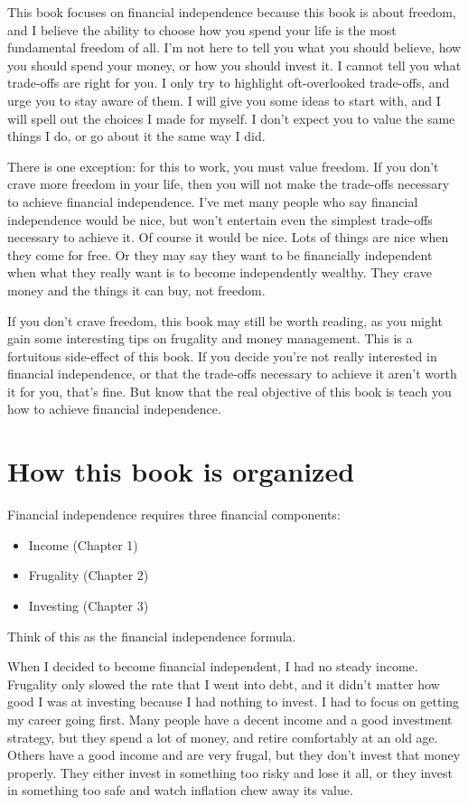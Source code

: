 This book focuses on financial independence because this book is about freedom, and I believe the ability to choose how you spend your life is the most fundamental freedom of all. I'm not here to tell you what you should believe, how you should spend your money, or how you should invest it. I cannot tell you what trade-offs are right for you. I only try to highlight oft-overlooked trade-offs, and urge you to stay aware of them. I will give you some ideas to start with, and I will spell out the choices I made for myself. I don't expect you to value the same things I do, or go about it the same way I did.

There is one exception: for this to work, you must value freedom. If you don't crave more freedom in your life, then you will not make the trade-offs necessary to achieve financial independence. I've met many people who say financial independence would be nice, but won't entertain even the simplest trade-offs necessary to achieve it. Of course it would be nice. Lots of things are nice when they come for free. Or they may say they want to be financially independent when what they really want is to become independently wealthy. They crave money and the things it can buy, not freedom.

If you don't crave freedom, this book may still be worth reading, as you might gain some interesting tips on frugality and money management. This is a fortuitous side-effect of this book. If you decide you're not really interested in financial independence, or that the trade-offs necessary to achieve it aren't worth it for you, that's fine. But know that the real objective of this book is teach you how to achieve financial independence.

\section{How this book is organized}
Financial independence requires three financial components:
\begin{itemize}
\item Income (Chapter 1)
\item Frugality (Chapter 2)
\item Investing (Chapter 3)
\end{itemize}

Think of this as the financial independence formula.

When I decided to become financial independent, I had no steady income. Frugality only slowed the rate that I went into debt, and it didn't matter how good I was at investing because I had nothing to invest. I had to focus on getting my career going first. Many people have a decent income and a good investment strategy, but they spend a lot of money, and retire comfortably at an old age. Others have a good income and are very frugal, but they don't invest that money properly. They either invest in something too risky and lose it all, or they invest in something too safe and watch inflation chew away its value.

